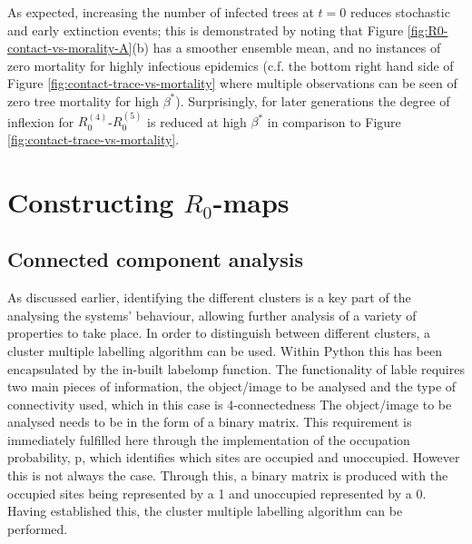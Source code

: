 As expected, increasing the number of infected trees at $t=0$ reduces stochastic and early extinction events;
this is demonstrated by noting that Figure \ref{fig:R0-contact-vs-morality-A}(b) has a smoother ensemble mean, and no instances of zero mortality for highly infectious epidemics (c.f. the bottom right hand side of Figure \ref{fig:contact-trace-vs-mortality} where multiple observations can be seen of zero tree mortality for high $\beta^*$).
Surprisingly, for later generations the degree of inflexion for $R_0^{(4)}$-$R_0^{(5)}$ is reduced at high $\beta^*$ in comparison to Figure \ref{fig:contact-trace-vs-mortality}.

\newpage


\chapter{Constructing $R_0$-maps}

\label{section:ga-SEIR-variant}

\section{Connected component analysis}
\label{a:CCA}

As discussed earlier, identifying the different clusters is a key part of the analysing the systems’ behaviour, 
allowing further analysis of a variety of properties to take place. 
In order to distinguish between different clusters, a cluster multiple labelling algorithm can be used. 
Within Python this has been encapsulated by the in-built labelomp function. 
The functionality of lable requires two main pieces of information, the object/image to be analysed and the type of connectivity used, which in this case is 4-connectedness
The object/image to be analysed needs to be in the form of a binary matrix. 
This requirement is immediately fulfilled here through the implementation of the occupation probability, p, which identifies which sites are occupied and unoccupied.
However this is not always the case. 
Through this, a binary matrix is produced with the occupied sites being represented by a 1 and unoccupied represented by a 0. 
Having established this, the cluster multiple labelling algorithm can be performed.

